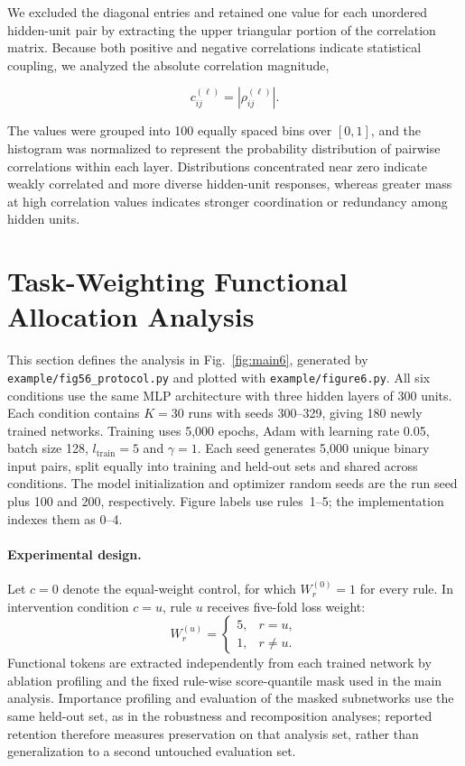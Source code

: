 \documentclass{article}
\begin{document}
We excluded the diagonal entries and retained one value for each unordered hidden-unit pair by extracting the upper triangular portion of the correlation matrix. Because both positive and negative correlations indicate statistical coupling, we analyzed the absolute correlation magnitude,

\[
c_{ij}^{(\ell)}
=
\left|
\rho_{ij}^{(\ell)}
\right|.
\]

The values were grouped into 100 equally spaced bins over $[0,1]$, and the histogram was normalized to represent the probability distribution of pairwise correlations within each layer. Distributions concentrated near zero indicate weakly correlated and more diverse hidden-unit responses, whereas greater mass at high correlation values indicates stronger coordination or redundancy among hidden units.

\section{Task-Weighting Functional Allocation Analysis}
\label{appendix:task_weighting_allocation}

This section defines the analysis in Fig.~\ref{fig:main6}, generated by \texttt{example/fig56\_protocol.py} and plotted with \texttt{example/figure6.py}. All six conditions use the same MLP architecture with three hidden layers of 300 units. Each condition contains $K=30$ runs with seeds 300--329, giving 180 newly trained networks. Training uses 5,000 epochs, Adam with learning rate 0.05, batch size 128, $l_{\mathrm{train}}=5$ and $\gamma=1$. Each seed generates 5,000 unique binary input pairs, split equally into training and held-out sets and shared across conditions. The model initialization and optimizer random seeds are the run seed plus 100 and 200, respectively. Figure labels use rules~1--5; the implementation indexes them as 0--4.

\paragraph{Experimental design.}
Let $c=0$ denote the equal-weight control, for which $W^{(0)}_r=1$ for every rule. In intervention condition $c=u$, rule $u$ receives five-fold loss weight:
\begin{equation}
W^{(u)}_r=
\begin{cases}
5, & r=u, \\
1, & r\ne u .
\end{cases}
\end{equation}
Functional tokens are extracted independently from each trained network by ablation profiling and the fixed rule-wise score-quantile mask used in the main analysis. Importance profiling and evaluation of the masked subnetworks use the same held-out set, as in the robustness and recomposition analyses; reported retention therefore measures preservation on that analysis set, rather than generalization to a second untouched evaluation set.
\end{document}
